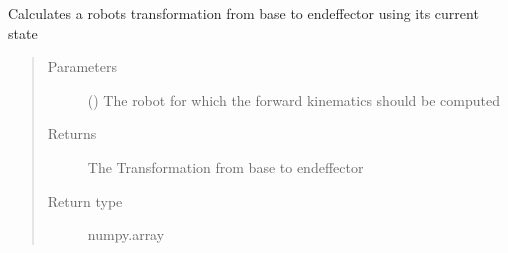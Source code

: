 \documentclass[letterpaper,10pt,english]{sphinxmanual}
\begin{document}

\begin{fulllineitems}
\label{\detokenize{code_docu:trip_kinematics.Robot.forward_kinematics}}
Calculates a robots transformation from base to endeffector using its current state
\begin{quote}\begin{description}
\item[{Parameters}] \leavevmode
{} ({\hyperref[\detokenize{code_docu:trip_kinematics.Robot.Robot}]{}}) \textendash{} The robot for which the forward kinematics should be computed

\item[{Returns}] \leavevmode
The Transformation from base to endeffector

\item[{Return type}] \leavevmode
numpy.array

\end{description}\end{quote}

\end{fulllineitems}

\end{document}
